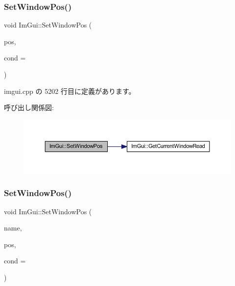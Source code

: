 \subsubsection{\texorpdfstring{Set\+Window\+Pos()}{SetWindowPos()}\hspace{0.1cm}{\footnotesize\ttfamily [1/2]}}
{\footnotesize\ttfamily void Im\+Gui\+::\+Set\+Window\+Pos (\begin{DoxyParamCaption}\item[{const \mbox{\hyperlink{struct_im_vec2}{Im\+Vec2}} \&}]{pos,  }\item[{\mbox{\hyperlink{imgui_8h_aef890d6ac872e12c5804d0b3e4f7f103}{Im\+Gui\+Cond}}}]{cond = {} }\end{DoxyParamCaption})}



 imgui.\+cpp の 5202 行目に定義があります。

呼び出し関係図\+:\nopagebreak
\begin{figure}[H]
\begin{center}
\leavevmode
\includegraphics[width=350pt]{namespace_im_gui_aaa81e004de4c0a5cedb836e92e8aa0e5_cgraph}
\end{center}
\end{figure}
\mbox{\label{namespace_im_gui_a32032b56f975bb3145adbe19f38f3b56}} 
\subsubsection{\texorpdfstring{Set\+Window\+Pos()}{SetWindowPos()}\hspace{0.1cm}{\footnotesize\ttfamily [2/2]}}
{\footnotesize\ttfamily void Im\+Gui\+::\+Set\+Window\+Pos (\begin{DoxyParamCaption}\item[{const char $\ast$}]{name,  }\item[{const \mbox{\hyperlink{struct_im_vec2}{Im\+Vec2}} \&}]{pos,  }\item[{\mbox{\hyperlink{imgui_8h_aef890d6ac872e12c5804d0b3e4f7f103}{Im\+Gui\+Cond}}}]{cond = {} }\end{DoxyParamCaption})}




